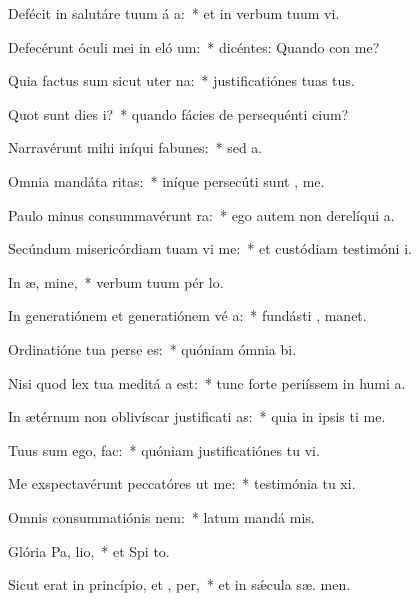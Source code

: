 \item Defécit in salutáre tuum á a:~* et in verbum tuum vi.
\item Defecérunt óculi mei in eló um:~* dicéntes: Quando con me?
\item Quia factus sum sicut uter  na:~* justificatiónes tuas   tus.
\item Quot sunt dies  i?~* quando fácies de persequénti  cium?
\item Narravérunt mihi iníqui fabunes:~* sed    a.
\item Omnia mandáta  ritas:~* iníque persecúti sunt ,  me.
\item Paulo minus consummavérunt   ra:~* ego autem non derelíqui  a.
\item Secúndum misericórdiam tuam vi me:~* et custódiam testimóni  i.
\item In æ, mine,~* verbum tuum pér  lo.
\item In generatiónem et generatiónem vé a:~* fundásti ,  manet.
\item Ordinatióne tua perse es:~* quóniam ómnia  bi.
\item Nisi quod lex tua meditá a est:~* tunc forte periíssem in humi a.
\item In ætérnum non oblivíscar justificati as:~* quia in ipsis ti me.
\item Tuus sum ego,   fac:~* quóniam justificatiónes tu vi.
\item Me exspectavérunt peccatóres ut  me:~* testimónia tu xi.
\item Omnis consummatiónis  nem:~* latum mandá  mis.
\item Glória Pa,  lio,~* et Spi to.
\item Sicut erat in princípio, et ,  per,~* et in sǽcula sæ. men.
